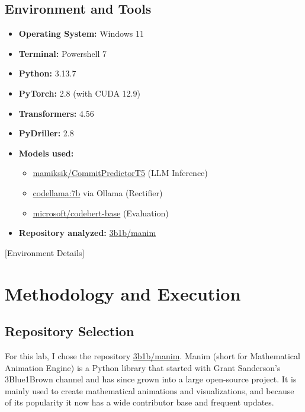 \documentclass[10pt,a4paper]{report}
\begin{document}
\subsection{Environment and Tools}
\begin{itemize}[itemsep=0.05em, topsep=0pt]
    \item \textbf{Operating System:} Windows 11
    \item \textbf{Terminal:} Powershell 7
    \item \textbf{Python:} 3.13.7
    \item \textbf{PyTorch:} 2.8 (with CUDA 12.9)
    \item \textbf{Transformers:} 4.56
    \item \textbf{PyDriller:} 2.8
    \item \textbf{Models used:}
    \begin{itemize}[itemsep=0.05em, topsep=0pt]
        \item \href{https://huggingface.co/mamiksik/CommitPredictorT5}{mamiksik/CommitPredictorT5} (LLM Inference)
        \item \href{https://ollama.com/library/codellama}{codellama:7b} via Ollama (Rectifier)
        \item \href{https://huggingface.co/microsoft/codebert-base}{microsoft/codebert-base} (Evaluation)
    \end{itemize}
    \item \textbf{Repository analyzed:} \href{https://github.com/3b1b/manim}{3b1b/manim}
\end{itemize}

[Environment Details]

\section{Methodology and Execution}

\subsection{Repository Selection}
For this lab, I chose the repository \href{https://github.com/3b1b/manim}{3b1b/manim}. Manim (short for Mathematical Animation Engine) is a Python library that started with Grant Sanderson’s 3Blue1Brown channel and has since grown into a large open-source project. It is mainly used to create mathematical animations and visualizations, and because of its popularity it now has a wide contributor base and frequent updates.
\end{document}
